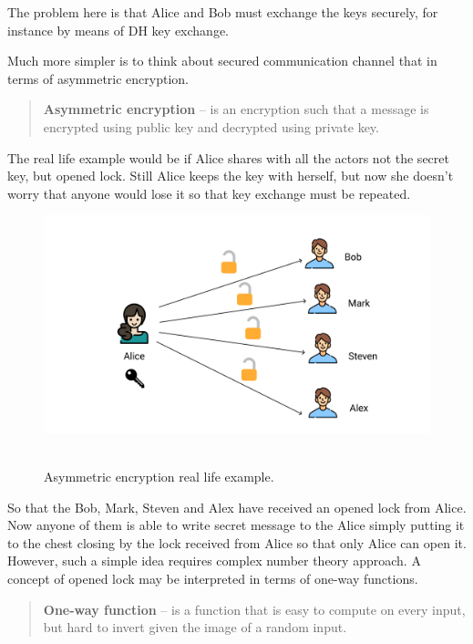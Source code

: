 \documentclass[12pt,letterpaper,oneside,reqno]{amsart}
\begin{document}
    The problem here is that Alice and Bob must exchange the keys securely, for instance by means of DH key exchange.

    Much more simpler is to think about secured communication channel that in terms of asymmetric encryption.
    \begin{quote}
        \textbf{Asymmetric encryption} -- is an encryption such that a message is encrypted using public key and
        decrypted using private key.
    \end{quote}
    The real life example would be if Alice shares with all the actors not the secret key, but opened lock.
    Still Alice keeps the key with herself, but now she doesn't worry that anyone would lose it so that key exchange must be repeated.
    \begin{figure}[H]
        \centering
        \includegraphics[width=1\textwidth]{Asymmetric_encryption}
        ~\caption{Asymmetric encryption real life example.}\label{fig:figure2}
    \end{figure}
    So that the Bob, Mark, Steven and Alex have received an opened lock from Alice.
    Now anyone of them is able to write secret message to the Alice simply putting it to the chest closing by the lock
    received from Alice so that only Alice can open it.
    However, such a simple idea requires complex number theory approach.
    A concept of opened lock may be interpreted in terms of one-way functions.
    \begin{quote}
        \textbf{One-way function} -- is a function that is easy to compute on every input, but hard to invert given the image of
        a random input.
    \end{quote}
\end{document}

